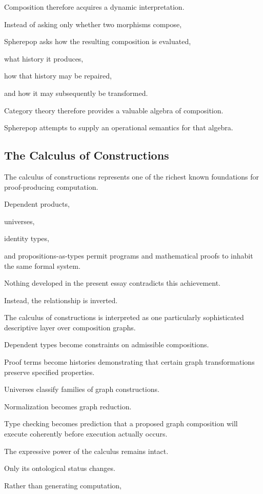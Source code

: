 \documentclass[12pt,oneside]{article}
\begin{document}
Composition therefore acquires a dynamic interpretation.

Instead of asking only whether two morphisms compose,

Spherepop asks how the resulting composition is evaluated,

what history it produces,

how that history may be repaired,

and how it may subsequently be transformed.

Category theory therefore provides a valuable algebra of composition.

Spherepop attempts to supply an operational semantics for that algebra.

\subsection{The Calculus of Constructions}

The calculus of constructions represents one of the richest known foundations for proof-producing computation.

Dependent products,

universes,

identity types,

and propositions-as-types permit programs and mathematical proofs to inhabit the same formal system.

Nothing developed in the present essay contradicts this achievement.

Instead, the relationship is inverted.

The calculus of constructions is interpreted as one particularly sophisticated descriptive layer over composition graphs.

Dependent types become constraints on admissible compositions.

Proof terms become histories demonstrating that certain graph transformations preserve specified properties.

Universes classify families of graph constructions.

Normalization becomes graph reduction.

Type checking becomes prediction that a proposed graph composition will execute coherently before execution actually occurs.

The expressive power of the calculus remains intact.

Only its ontological status changes.

Rather than generating computation,
\end{document}
